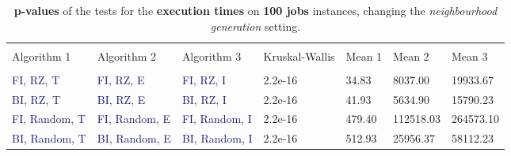 \documentclass[
12pt,
a4paper,
oneside,
headinclude,
footinclude]{article}
\theoremstyle{definition} %
\begin{document}
\begin{table}[H]
    \hspace*{-1.8cm}
    \begin{tabular}{l l l l l l l} %
        \hline
        \hline 
        \\[-1.5ex]
        \textcolor{BrickRed}{Algorithm 1} & \textcolor{BrickRed}{Algorithm 2}  & \textcolor{BrickRed}{Algorithm 3} & \textcolor{BrickRed}{Kruskal-Wallis} & \textcolor{BrickRed}{Mean 1} & \textcolor{BrickRed}{Mean 2} & \textcolor{BrickRed}{Mean 3}\\ [0.5ex]
        \hline %
        \\[-1.5ex]
        
        \textcolor{MidnightBlue}{FI, RZ, T}     & \textcolor{MidnightBlue}{FI, RZ, E}     & \textcolor{MidnightBlue}{FI, RZ, I}& 2.2e-16 & 34.83 & 8037.00 & 19933.67 \\ 
        \textcolor{MidnightBlue}{BI, RZ, T}     & \textcolor{MidnightBlue}{BI, RZ, E}     & \textcolor{MidnightBlue}{BI, RZ, I} & 2.2e-16 & 41.93 & 5634.90 & 15790.23 \\ 
        \textcolor{MidnightBlue}{FI, Random, T} & \textcolor{MidnightBlue}{FI, Random, E} & \textcolor{MidnightBlue}{FI, Random, I} & 2.2e-16 & 479.40 & 112518.03 & 264573.10 \\ 
        \textcolor{MidnightBlue}{BI, Random, T} & \textcolor{MidnightBlue}{BI, Random, E} & \textcolor{MidnightBlue}{BI, Random, I} &2.2e-16 & 512.93 & 25956.37 & 58112.23 \\ 
        [1ex] %
        \hline %
    \end{tabular}
    \caption{\label{tab:ii-n100exec}\textbf{p-values} of the tests for the \textbf{execution times} on \textbf{100 jobs} instances, changing the \textit{neighbourhood generation} setting.}
\end{table} 
\end{document}
